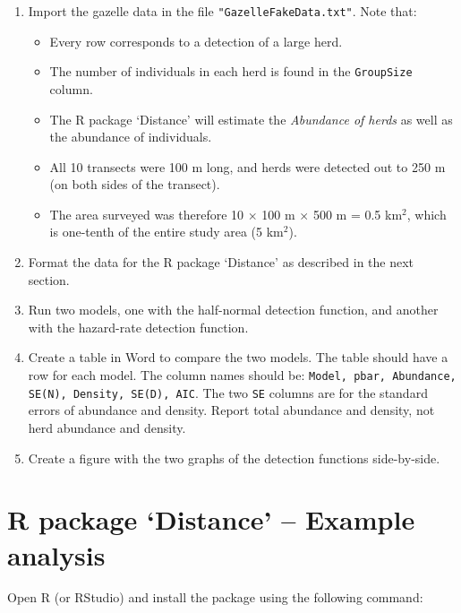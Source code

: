 \documentclass[12pt]{article}\usepackage[]{graphicx}\usepackage[]{xcolor}
\newcommand{\inr}[1]{\colorbox{inlinecolor}{\texttt{#1}}}
\begin{document}
\begin{enumerate}
  \item Import the gazelle data in the file
    \verb+"GazelleFakeData.txt"+. Note that:
    \begin{itemize}
      \item Every row corresponds to a detection of a large herd.
      \item The number of individuals in each herd is found in
        the \inr{GroupSize} column. 
      \item The R package `Distance' will estimate the
        \textit{Abundance of herds} as well as the abundance of
        individuals.
      \item All 10 transects were 100 m long, and herds were detected
        out to 250 m (on both sides of the transect).
      \item The area surveyed was therefore
        10 $\times$ 100 m $\times$ 500 m = 0.5 km$^2$,
        which is one-tenth of the entire study area (5 km$^2$).
    \end{itemize}
  \item Format the data for the R package `Distance' as described in
    the next section.  
  \item Run two models, one with the half-normal detection function,
    and another with the hazard-rate detection function.
  \item Create a table in Word to compare the two models. The table
    should have a row for each model. The column names should be:
    \texttt{Model, pbar, Abundance, SE(N), Density, SE(D), AIC}.
    The two \verb+SE+ columns are for the standard errors of
    abundance and density. Report total abundance and density, not
    herd abundance and density.
  \item Create a figure with the two graphs of the detection functions
    side-by-side.
\end{enumerate}



\clearpage




\section*{R package `Distance' -- Example analysis}

Open R (or RStudio) and install the package using the following
command:
\end{document}
